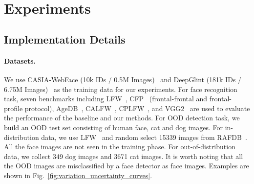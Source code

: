 \documentclass[letterpaper]{article} %
\begin{document}
\section{Experiments}
\label{sec:experiments}

\subsection{Implementation Details}
\label{ssec:details}


\paragraph{Datasets.}
We use CASIA-WebFace (10k IDs / 0.5M Images)~\cite{yi2014learning} and DeepGlint (181k IDs / 6.75M Images)~\cite{deepglint} as the training data for our experiments. For face recognition task, seven benchmarks including LFW~\cite{huang2008labeled}, CFP~\cite{sengupta2016frontal} (frontal-frontal and frontal-profile protocol), AgeDB~\cite{moschoglou2017agedb}, CALFW~\cite{zheng2017cross}, CPLFW~\cite{zheng2018cross}, and VGG2~\cite{cao2018vggface2} are used to evaluate the performance of the baseline and our methods. For OOD detection task, we build an OOD test set consisting of human face, cat and dog images. For in-distribution data, we use LFW~\cite{huang2008labeled} and random select 15339 images from RAFDB~\cite{li2017reliable}. All the face images are not seen in the training phase. For out-of-distribution data, we collect 349 dog images and 3671 cat images. It is worth noting that all the OOD images are misclassified by a face detector as face images. Examples are shown in Fig.~\ref{fig:variation_uncertainty_curves}.
\end{document}
